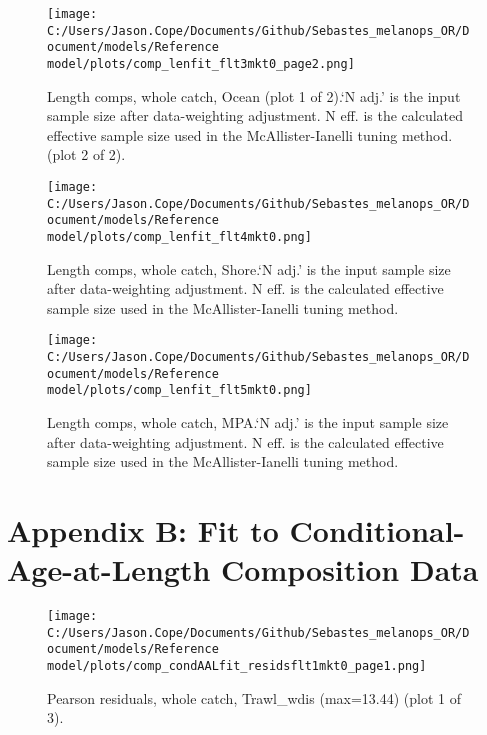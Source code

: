 \documentclass[11pt,
  english,
  letterpaper,
]{article}
\begin{document}
\begin{figure}
\centering
\texttt{[image: C:/Users/Jason.Cope/Documents/Github/Sebastes\_melanops\_OR/Document/models/Reference model/plots/comp\_lenfit\_flt3mkt0\_page2.png]}
\caption{Length comps, whole catch, Ocean (plot 1 of 2).`N adj.' is the input sample size after data-weighting adjustment. N eff. is the calculated effective sample size used in the McAllister-Ianelli tuning method. (plot 2 of 2).\label{fig:comp_lenfit_flt3mkt0_page2}}
\end{figure}

\begin{figure}
\centering
\texttt{[image: C:/Users/Jason.Cope/Documents/Github/Sebastes\_melanops\_OR/Document/models/Reference model/plots/comp\_lenfit\_flt4mkt0.png]}
\caption{Length comps, whole catch, Shore.`N adj.' is the input sample size after data-weighting adjustment. N eff. is the calculated effective sample size used in the McAllister-Ianelli tuning method.\label{fig:comp_lenfit_flt4mkt0}}
\end{figure}

\begin{figure}
\centering
\texttt{[image: C:/Users/Jason.Cope/Documents/Github/Sebastes\_melanops\_OR/Document/models/Reference model/plots/comp\_lenfit\_flt5mkt0.png]}
\caption{Length comps, whole catch, MPA.`N adj.' is the input sample size after data-weighting adjustment. N eff. is the calculated effective sample size used in the McAllister-Ianelli tuning method.\label{fig:comp_lenfit_flt5mkt0}}
\end{figure}

\clearpage

\hypertarget{app-b}{%
\section{Appendix B: Fit to Conditional-Age-at-Length Composition Data}\label{app-b}}

\begin{figure}
\centering
\texttt{[image: C:/Users/Jason.Cope/Documents/Github/Sebastes\_melanops\_OR/Document/models/Reference model/plots/comp\_condAALfit\_residsflt1mkt0\_page1.png]}
\caption{Pearson residuals, whole catch, Trawl\_wdis (max=13.44) (plot 1 of 3).\label{fig:comp_condAALfit_residsflt1mkt0_page1}}
\end{figure}
\end{document}
